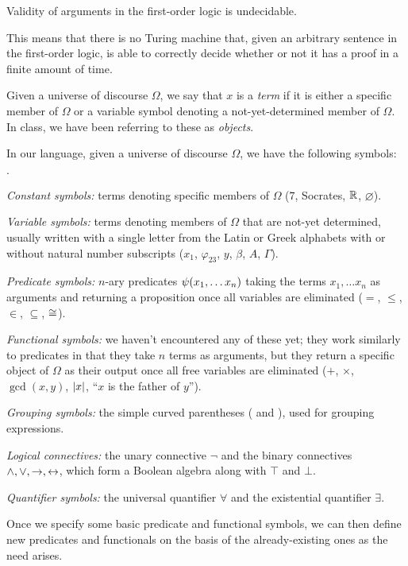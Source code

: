 \begin{theorem}
    Validity of arguments in the first-order logic is undecidable.

    This means that there is no Turing machine that,
    given an arbitrary sentence in the first-order logic,
    is able to correctly decide whether or not it has a proof in a finite amount of time.
\end{theorem}

\begin{definition}[Term]
    Given a universe of discourse $\Omega$,
    we say that $x$ is a \emph{term} if it is either a specific member of $\Omega$
    or a variable symbol denoting a not-yet-determined member of $\Omega$.
    In class, we have been referring to these as \emph{objects}.
\end{definition}

\begin{definition}
    In our language, given a universe of discourse $\Omega$, we have the following symbols:
    \begin{list}{$\cdot$}{}
        \item
            \emph{Constant symbols:} terms denoting specific members of $\Omega$
            (\eg $7$, Socrates, $\mathbb{R}$, $\varnothing$).
        \item
            \emph{Variable symbols:} terms denoting members of $\Omega$ that are not-yet determined,
            usually written with a single letter from the Latin or Greek alphabets
            with or without natural number subscripts
            (\eg $x_1$, $\varphi_{23}$, $y$, $\beta$, $A$, $\Gamma$).
        \item
            \emph{Predicate symbols:} $n$-ary predicates $\psi\pn*{x_1, \dots x_n}$
            taking the terms $x_1, \dots x_n$ as arguments and returning a proposition once all variables are eliminated
            (\eg $=$, $\leq$, $\in$, $\subseteq$, $\cong$).
        \item
            \emph{Functional symbols:} we haven't encountered any of these yet;
            they work similarly to predicates in that they take $n$ terms as arguments,
            but they return a specific object of $\Omega$ as their output
            once all free variables are eliminated
            (\eg $+$, $\times$, $\gcd(x, y)$, $\lvert x\rvert$, ``$x$ is the father of $y$'').
        \item
            \emph{Grouping symbols:} the simple curved parentheses ( and ), used for grouping expressions.
        \item
            \emph{Logical connectives:} the unary connective $\neg$
            and the binary connectives $\wedge, \vee, \rightarrow, \leftrightarrow$,
            which form a Boolean algebra along with $\top$ and $\bot$.
        \item
            \emph{Quantifier symbols:} the universal quantifier $\forall$
            and the existential quantifier $\exists$.
    \end{list}
    Once we specify some basic predicate and functional symbols,
    we can then define new predicates and functionals on the basis of the already-existing ones
    as the need arises.
\end{definition}

